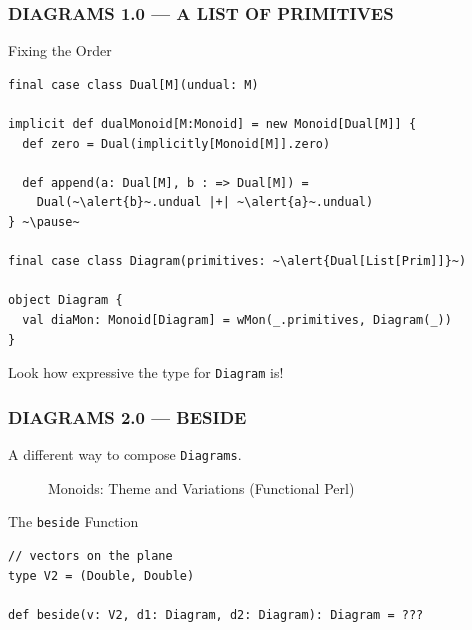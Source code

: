 \documentclass{beamer}
\begin{document}
\begin{frame}[fragile] \frametitle{DIAGRAMS 1.0 --- A LIST OF PRIMITIVES}
  \begin{block}{Fixing the Order}
    \vspace{-0.2cm}
  \begin{lstlisting}
final case class Dual[M](undual: M)

implicit def dualMonoid[M:Monoid] = new Monoid[Dual[M]] {
  def zero = Dual(implicitly[Monoid[M]].zero)

  def append(a: Dual[M], b : => Dual[M]) =
    Dual(~\alert{b}~.undual |+| ~\alert{a}~.undual)
} ~\pause~

final case class Diagram(primitives: ~\alert{Dual[List[Prim]]}~)

object Diagram {
  val diaMon: Monoid[Diagram] = wMon(_.primitives, Diagram(_))
}
  \end{lstlisting}
    \vspace{-0.5cm}
  \end{block}

Look how expressive the type for \texttt{Diagram} is!
\end{frame}

\begin{frame}[fragile] \frametitle{DIAGRAMS 2.0 --- BESIDE}
A different way to compose \texttt{Diagrams}.

  \begin{figure}
      \centering
      \caption{Monoids: Theme and Variations (Functional Perl)}
  \end{figure}

\vspace{-0.5cm}

  \begin{block}{The \texttt{beside} Function}
    \vspace{-0.2cm}
  \begin{lstlisting}
// vectors on the plane
type V2 = (Double, Double)

def beside(v: V2, d1: Diagram, d2: Diagram): Diagram = ???
  \end{lstlisting}
\vspace{-0.5cm}
  \end{block}
\end{frame}
\end{document}
